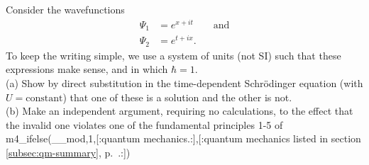 Consider the wavefunctions
\begin{align*}
  \Psi_1 &= e^{x+it} \qquad \text{and} \\
  \Psi_2 &= e^{t+ix}.
\end{align*}
To keep the writing simple, we use a system of units (not SI) such that these expressions make
sense, and in which $\hbar=1$.\\
(a) Show by direct substitution in the time-dependent Schr\"odinger equation (with $U=\text{constant}$)
that one of these
is a solution and the other is not.\\
(b) Make an independent argument, requiring no calculations, to the effect that the invalid
one violates one of the fundamental principles 1-5 of
m4_ifelse(__mod,1,[:quantum mechanics.:],[:quantum mechanics listed in section
\ref{subsec:qm-summary}, p.~\pageref{subsec:qm-summary}.:])



